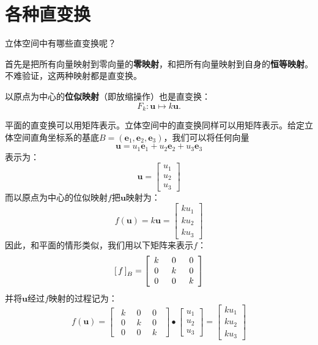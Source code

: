 \documentclass[12pt,UTF8,fontset=none]{ctexbook}
\begin{document}
\section{各种直变换}

立体空间中有哪些直变换呢？

首先是把所有向量映射到零向量的\textbf{零映射}，和把所有向量映射到自身的\textbf{恒等映射}。
不难验证，这两种映射都是直变换。

以原点为中心的\textbf{位似映射}（即放缩操作）也是直变换：
$$ F_k : \mathbf{u} \mapsto k\mathbf{u}.$$

平面的直变换可以用矩阵表示。立体空间中的直变换同样可以用矩阵表示。给定立体空间直角坐标系的基底$B = (\mathbf{e}_1, \mathbf{e}_2, \mathbf{e}_3)$，我们可以将任何向量
$$ \mathbf{u} = u_1\mathbf{e}_1 + u_2\mathbf{e}_2 + u_3\mathbf{e}_3$$
表示为：
$$ \mathbf{u} = \begin{bmatrix}
    u_1 \\ u_2 \\ u_3
\end{bmatrix} $$
而以原点为中心的位似映射$f$把$\mathbf{u}$映射为：
$$ f(\mathbf{u}) =  k\mathbf{u} = \begin{bmatrix}
    ku_1 \\ ku_2 \\ ku_3
\end{bmatrix} $$
因此，和平面的情形类似，我们用以下矩阵来表示$f$：
$$
\bmat{f}[B] = \begin{bmatrix}
    \phantom{0}k & \phantom{0}0\phantom{0} & 0\phantom{0} \\ \phantom{0}0 & \phantom{0}k\phantom{0} & 0\phantom{0} \\ \phantom{0}0 & \phantom{0}0\phantom{0} & k\phantom{0}
\end{bmatrix}
$$
并将$\mathbf{u}$经过$f$映射的过程记为：
$$
f(\mathbf{u}) = \begin{bmatrix}
    \phantom{0}k & \phantom{0}0\phantom{0} & 0\phantom{0} \\ \phantom{0}0 & \phantom{0}k\phantom{0} & 0\phantom{0} \\ \phantom{0}0 & \phantom{0}0\phantom{0} & k\phantom{0}
\end{bmatrix} \bullet \begin{bmatrix}
    u_1 \\ u_2 \\ u_3
\end{bmatrix} = \begin{bmatrix}
    ku_1 \\ ku_2 \\ ku_3
\end{bmatrix}
$$
\end{document}
